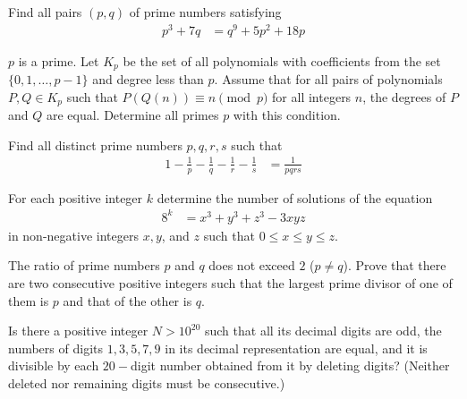 \begin{problem}
	Find all pairs $(p, q)$ of prime numbers satisfying
		\begin{align*}
			p^3+7q
				& = q^9+5p^2+18p
		\end{align*}
\end{problem}

\begin{problem}
	$p$ is a prime. Let $K_p$ be the set of all polynomials with coefficients from the set $\{0,1,\dots ,p-1\}$ and degree less than $p$. Assume that for all pairs of polynomials $P,Q\in K_p$ such that $P(Q(n))\equiv n\pmod p$ for all integers $n$, the degrees of $P$ and $Q$ are equal. Determine all primes $p$ with this condition. %
\end{problem}

\begin{problem}
	Find all distinct prime numbers $p,q,r,s$ such that
		\begin{align*}
			1-\frac{1}{p} - \frac{1}{q} -\frac{1}{r} - \frac{1}{s}
				& =\frac{1}{pqrs}
		\end{align*}
\end{problem}

\begin{problem}
	For each positive integer $k$ determine the number of solutions of the equation
		\begin{align*}
			8^k
				& = x^3 + y^3 + z^3 - 3xyz
		\end{align*}
	in non-negative integers $x,y$, and $z$ such that $0 \leq x \leq y \leq z$.
\end{problem}

\begin{problem}
	The ratio of prime numbers $p$ and $q$ does not exceed $2$ ($p \neq q$). Prove
	that there are two consecutive positive integers such that the largest
	prime divisor of one of them is $p$ and that of the other is $q$.
\end{problem}

\begin{problem}
	Is there a positive integer $N > 10^{20}$ such that all its decimal digits
	are odd, the numbers of digits $1, 3, 5, 7, 9$ in its decimal representation
	are equal, and it is divisible by each $20-$digit number obtained from it by
	deleting digits? (Neither deleted nor remaining digits must be consecutive.)
\end{problem}

